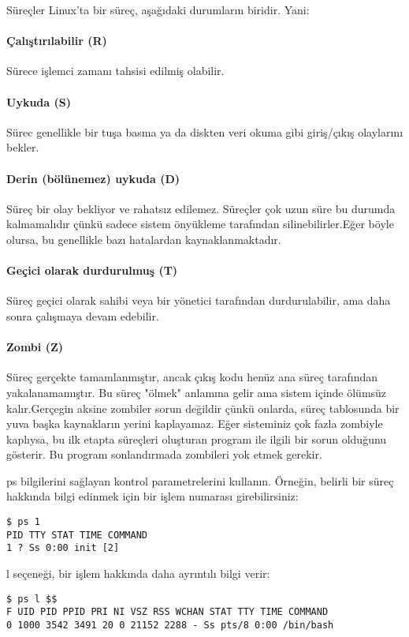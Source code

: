 \begin{section}{Süreçler}
Linux'ta bir süreç, aşağıdaki durumların biridir. Yani:
\paragraph{Çalıştırılabilir (R)}{Sürece işlemci zamanı tahsisi edilmiş olabilir.}
\paragraph{Uykuda (S)}{Sürec genellikle bir tuşa basma  ya da diskten veri okuma gibi  giriş/çıkış olaylarını bekler.}
\paragraph{Derin (bölünemez) uykuda (D)}{Süreç bir olay bekliyor ve rahatsız edilemez. Süreçler çok uzun süre bu durumda kalmamalıdır çünkü sadece sistem önyükleme tarafından silinebilirler.Eğer böyle olursa, bu genellikle bazı hatalardan kaynaklanmaktadır.}
\paragraph{Geçici olarak durdurulmuş (T)}{Süreç geçici olarak sahibi veya bir yönetici tarafından durdurulabilir, ama daha sonra çalışmaya devam edebilir.}
\paragraph{Zombi (Z)}{Süreç gerçekte tamamlanmıştır, ancak çıkış kodu henüz ana süreç tarafından yakalanamamıştır. Bu süreç "ölmek" anlamına gelir ama sistem içinde ölümsüz kalır.Gerçegin aksine zombiler sorun değildir çünkü onlarda, süreç tablosunda bir yuva başka kaynakların yerini kaplayamaz. Eğer sisteminiz çok fazla zombiyle kaplıysa, bu ilk etapta süreçleri oluşturan program ile ilgili bir sorun olduğunu gösterir. Bu program sonlandırmada zombileri yok etmek gerekir.
}

ps bilgilerini sağlayan kontrol parametrelerini kullanın. Örneğin, belirli bir süreç hakkında bilgi edinmek için bir işlem numarası girebilirsiniz:
\begin{verbatim}
$ ps 1
PID TTY STAT TIME COMMAND
1 ? Ss 0:00 init [2]
\end{verbatim}

l seçeneği, bir işlem hakkında daha ayrıntılı bilgi verir:
\begin{verbatim}
$ ps l $$
F UID PID PPID PRI NI VSZ RSS WCHAN STAT TTY TIME COMMAND
0 1000 3542 3491 20 0 21152 2288 - Ss pts/8 0:00 /bin/bash
\end{verbatim}


\end{section}
